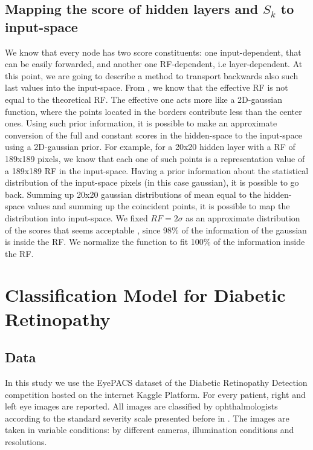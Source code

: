 \documentclass[review]{elsarticle}
\theoremstyle{definition} %
\theoremstyle{remark}
\begin{document}
\subsection{Mapping the score of hidden layers and $S_k$ to input-space}\label{sec:mapping-input}

We know that every node has two score constituents: one input-dependent, that can be easily forwarded, and another one RF-dependent, i.e layer-dependent. At this point, we are going to describe a method to transport backwards also such last values into the input-space. From \cite{luo2016understanding}, we know that the effective RF is not equal to the theoretical RF. The effective one acts more like a 2D-gaussian function, where the points located in the borders contribute less than the center ones. Using such prior information, it is possible to make an approximate conversion of the full and constant scores in the hidden-space to the input-space using a 2D-gaussian prior. For example, for a 20x20 hidden layer with a RF of 189x189 pixels, we know that each one of such points is a representation value of a 189x189 RF in the input-space. Having a prior information about the statistical distribution of the input-space pixels (in this case gaussian), it is possible to go back. Summing up 20x20 gaussian distributions of mean equal to the hidden-space values and summing up the coincident points, it is possible to map the distribution into input-space. We fixed $RF = 2\sigma$ as an approximate distribution of the scores that seems acceptable \cite{luo2016understanding}, since 98\% of the information of the gaussian is inside the RF. We normalize the function to fit 100\% of the information inside the RF.

\section{Classification Model for Diabetic Retinopathy}\label{sec:class}

\subsection{Data}
\label{sec:data}

In this study we use the EyePACS dataset of the Diabetic Retinopathy Detection competition hosted on the internet Kaggle Platform.  For every patient, right and left eye images are reported. All images are classified by ophthalmologists according to the standard severity scale presented before in \cite{diaclass}. The images are taken in variable conditions: by different cameras, illumination conditions and resolutions. 
\end{document}
